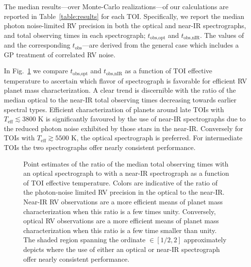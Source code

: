 The median results---over Monte-Carlo realizations---of our calculations
are reported in Table~\ref{table:results} for
each TOI. Specifically, we report the median photon noise-limited RV precision in both the optical and
near-IR spectrographs, \sigact{,} \sigplan{,} \nrv{,} and total observing times in each spectrograph;
$t_{\text{obs,opt}}$ and $t_{\text{obs,nIR}}$. The values of \nrv{---}and the corresponding
$t_{\text{obs}}$---are derived from the general case which includes a GP treatment of correlated RV noise.

In Fig.~\ref{fig:ratio} we compare $t_{\text{obs,opt}}$ and $t_{\text{obs,nIR}}$ as a function of
TOI effective temperature to ascertain which flavor of spectrograph is favorable for efficient RV planet
mass characterization. A clear trend is discernible with the ratio of the median optical
to the near-IR total observing times decreasing towards earlier spectral types.
Efficient characterization of planets around
late TOIs with $T_{\text{eff}} \lesssim 3800$ K is significantly favoured by the use of near-IR spectrographs
due to the reduced photon noise exhibited by those stars in the near-IR.
Conversely for TOIs with $T_{\text{eff}} \gtrsim 5500$ K, the optical spectrograph is preferred. For
intermediate TOIs the two spectrographs offer nearly consistent performance.

\begin{figure}
  \centering
  \caption{Point estimates of
    the ratio of the median total observing times with an optical spectrograph to with a
    near-IR spectrograph as a function of TOI effective temperature. Colors are indicative of the
    ratio of the photon-noise limited RV precision in the optical to the near-IR. Near-IR RV observations
    are a more efficient means of planet mass characterization when this ratio is a few times unity.
    Conversely, optical RV observations are a more efficient means of planet mass characterization when
    this ratio is a few time smaller than unity. The shaded region spanning the ordinate $\in [1/2,2]$
    approximately depicts where the use of either an optical or near-IR spectrograph offer nearly
    consistent performance.}
  \label{fig:ratio}
\end{figure}

